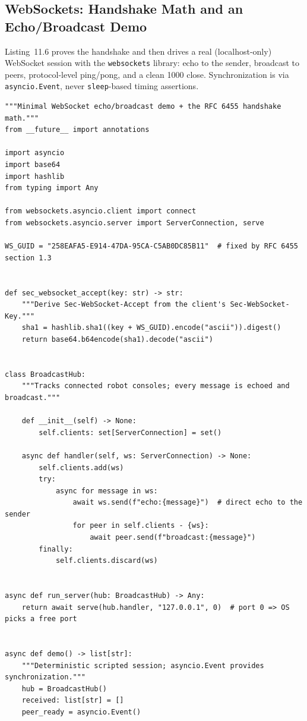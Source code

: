 \subsection{WebSockets: Handshake Math and an Echo/Broadcast Demo}
\label{sec:ch11-code-ws}

Listing~11.6 proves the handshake and then drives a real (localhost-only)
WebSocket session with the \texttt{websockets} library: echo to the sender,
broadcast to peers, protocol-level ping/pong, and a clean 1000 close.
Synchronization is via \texttt{asyncio.Event}, never \texttt{sleep}-based
timing assertions.

\begin{verbatim}
"""Minimal WebSocket echo/broadcast demo + the RFC 6455 handshake math."""
from __future__ import annotations

import asyncio
import base64
import hashlib
from typing import Any

from websockets.asyncio.client import connect
from websockets.asyncio.server import ServerConnection, serve

WS_GUID = "258EAFA5-E914-47DA-95CA-C5AB0DC85B11"  # fixed by RFC 6455 section 1.3


def sec_websocket_accept(key: str) -> str:
    """Derive Sec-WebSocket-Accept from the client's Sec-WebSocket-Key."""
    sha1 = hashlib.sha1((key + WS_GUID).encode("ascii")).digest()
    return base64.b64encode(sha1).decode("ascii")


class BroadcastHub:
    """Tracks connected robot consoles; every message is echoed and broadcast."""

    def __init__(self) -> None:
        self.clients: set[ServerConnection] = set()

    async def handler(self, ws: ServerConnection) -> None:
        self.clients.add(ws)
        try:
            async for message in ws:
                await ws.send(f"echo:{message}")  # direct echo to the sender
                for peer in self.clients - {ws}:
                    await peer.send(f"broadcast:{message}")
        finally:
            self.clients.discard(ws)


async def run_server(hub: BroadcastHub) -> Any:
    return await serve(hub.handler, "127.0.0.1", 0)  # port 0 => OS picks a free port


async def demo() -> list[str]:
    """Deterministic scripted session; asyncio.Event provides synchronization."""
    hub = BroadcastHub()
    received: list[str] = []
    peer_ready = asyncio.Event()


\end{verbatim}
